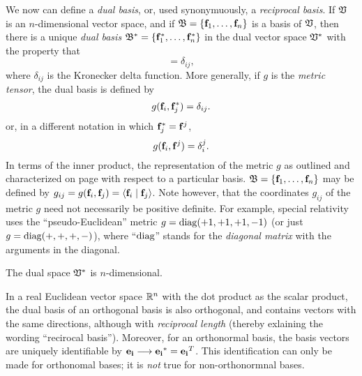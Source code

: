 We now can define a {\em dual basis}, or, used synonymuously, a {\em reciprocal basis}.
If ${\frak V}$ is an $n$-dimensional vector space, and if
${\frak B} = \{{\bf f}_1,\ldots , {\bf f}_n\}$
is a basis of  ${\frak V}$,
then there is a unique {\em dual basis}
${\frak B}^*
=\{{\bf f}_1^*,\ldots , {\bf f}_n^*\}$ in the dual vector space ${\frak V}^*$
with the property that
\begin{equation}
[{\bf f}_i,  {\bf f}_j^*]=\delta_{ij},
\label{2011-m-Dualbasis-e1}
\end{equation}
where  $\delta_{ij}$
is the Kronecker delta function.
More generally, if $g$ is the {\em metric tensor},
the dual basis is defined by
\begin{equation}
g( {\bf f}_i,{\bf f}_j^*)=\delta_{ij}.
\label{2011-m-Dualbasis-e2}
\end{equation}
or, in a different notation in which ${\bf f}_j^* = {\bf f}^j$,
\begin{equation}
g( {\bf f}_i,{\bf f}^j)=\delta_{i}^j.
\label{2011-m-Dualbasis-e3}
\end{equation}
In terms of the inner product, the representation
of the metric $g$ as outlined and characterized on page \pageref{2011-m-metrict} with respect to a particular basis.
${\frak B} = \{{\bf f}_1,\ldots , {\bf f}_n\}$
may be defined by $g_{ij}=g({\bf f}_i,{\bf f}_j)=\langle {\bf f}_i\mid {\bf f}_j\rangle$.
Note however, that the coordinates $g_{ij}$ of
the metric $g$ need not necessarily be positive definite.
For example,  special relativity uses the ``pseudo-Euclidean'' metric
 $g={\rm diag}(+1,+1,+1,-1)$ (or just $g={\rm diag}(+,+,+,-)$), where ``${\rm diag}$''
stands for the {\em diagonal matrix}
with the arguments in the diagonal.


The dual space  ${\frak V}^*$  is $n$-dimensional.

In a real Euclidean vector space ${\Bbb R}^n$
with the dot product as the scalar product,
the dual basis of an orthogonal basis  is also orthogonal, and contains vectors with the same directions, although with {\em reciprocal length} (thereby exlaining the wording ``recirocal basis'').
Moreover, for an orthonormal basis, the basis vectors are uniquely identifiable by
${\bf e_i} \longrightarrow {\bf e_i}^* = {\bf e_i}^T$.
This identification can only be made for orthonomal bases; it is {\em not} true for non-orthonormnal bases.

